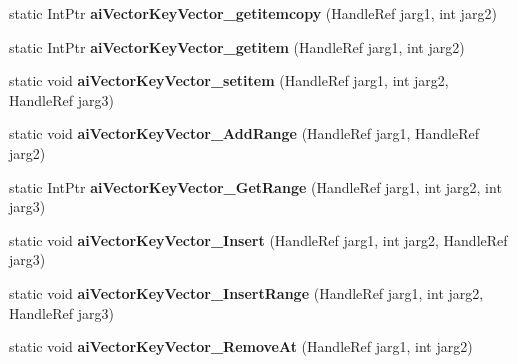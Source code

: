 \begin{DoxyCompactItemize}
\item 
\hypertarget{class_assimp_p_i_n_v_o_k_e_aacd057c0251c78499eda6a41e9e8c584}{static Int\+Ptr {\bfseries ai\+Vector\+Key\+Vector\+\_\+getitemcopy} (Handle\+Ref jarg1, int jarg2)}\label{class_assimp_p_i_n_v_o_k_e_aacd057c0251c78499eda6a41e9e8c584}

\item 
\hypertarget{class_assimp_p_i_n_v_o_k_e_a2b0d636c84efd385a459d965a5a5dbc2}{static Int\+Ptr {\bfseries ai\+Vector\+Key\+Vector\+\_\+getitem} (Handle\+Ref jarg1, int jarg2)}\label{class_assimp_p_i_n_v_o_k_e_a2b0d636c84efd385a459d965a5a5dbc2}

\item 
\hypertarget{class_assimp_p_i_n_v_o_k_e_acafee5f4e3100950e8042ad5c2558a0f}{static void {\bfseries ai\+Vector\+Key\+Vector\+\_\+setitem} (Handle\+Ref jarg1, int jarg2, Handle\+Ref jarg3)}\label{class_assimp_p_i_n_v_o_k_e_acafee5f4e3100950e8042ad5c2558a0f}

\item 
\hypertarget{class_assimp_p_i_n_v_o_k_e_a0738d20c7e08a65754367c978bb3c187}{static void {\bfseries ai\+Vector\+Key\+Vector\+\_\+\+Add\+Range} (Handle\+Ref jarg1, Handle\+Ref jarg2)}\label{class_assimp_p_i_n_v_o_k_e_a0738d20c7e08a65754367c978bb3c187}

\item 
\hypertarget{class_assimp_p_i_n_v_o_k_e_a8ebaa32fc136a2e8fbd95deaf48cb0b3}{static Int\+Ptr {\bfseries ai\+Vector\+Key\+Vector\+\_\+\+Get\+Range} (Handle\+Ref jarg1, int jarg2, int jarg3)}\label{class_assimp_p_i_n_v_o_k_e_a8ebaa32fc136a2e8fbd95deaf48cb0b3}

\item 
\hypertarget{class_assimp_p_i_n_v_o_k_e_ad72979cbd4226efbf38bff32e500a647}{static void {\bfseries ai\+Vector\+Key\+Vector\+\_\+\+Insert} (Handle\+Ref jarg1, int jarg2, Handle\+Ref jarg3)}\label{class_assimp_p_i_n_v_o_k_e_ad72979cbd4226efbf38bff32e500a647}

\item 
\hypertarget{class_assimp_p_i_n_v_o_k_e_afcefe58309f4b06ab6ab3637de82ddea}{static void {\bfseries ai\+Vector\+Key\+Vector\+\_\+\+Insert\+Range} (Handle\+Ref jarg1, int jarg2, Handle\+Ref jarg3)}\label{class_assimp_p_i_n_v_o_k_e_afcefe58309f4b06ab6ab3637de82ddea}

\item 
\hypertarget{class_assimp_p_i_n_v_o_k_e_a478061a9796d2d95154a2449c132d605}{static void {\bfseries ai\+Vector\+Key\+Vector\+\_\+\+Remove\+At} (Handle\+Ref jarg1, int jarg2)}\label{class_assimp_p_i_n_v_o_k_e_a478061a9796d2d95154a2449c132d605}


\end{DoxyCompactItemize}
